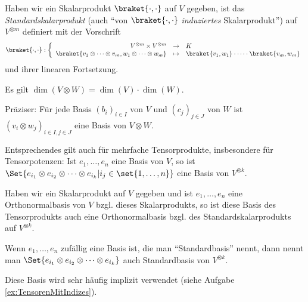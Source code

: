 \begin{lemmadef}
Haben wir ein Skalarprodukt $\braket{\cdot,\cdot}$ auf $V$ gegeben, ist das \emph{Standardskalarprodukt} (auch \enquote{von $\braket{\cdot,\cdot}$ \emph{induziertes} Skalarprodukt}) auf $V^{\otimes m}$ definiert mit der Vorschrift
\[
\braket{\cdot, \cdot} : 
\left\lbrace \begin{array}{rcl}
	V^{\otimes m} \times V^{\otimes m} &\to& K \\
\braket{v_1 \otimes \cdots \otimes v_m, w_1 \otimes \cdots \otimes w_m} &\mapsto& \braket{v_1,w_1} \cdot \cdots \cdot \braket{v_m, w_m}
\end{array}\right.
\]
und ihrer linearen Fortsetzung.
\end{lemmadef}

\begin{lemma}\label{tensorprodukt:dimension}
Es gilt $\dim(V\otimes W) = \dim(V)\cdot\dim(W)$.

Präziser: Für jede Basis $(b_i)_{i\in I}$ von $V$ und $(c_j)_{j\in J}$ von $W$ ist $(v_i\otimes w_j)_{i\in I, j\in J}$ eine Basis von $V\otimes W$.
\end{lemma}

\begin{corollary}
Entsprechendes gilt auch für mehrfache Tensorprodukte, insbesondere für Tensorpotenzen: Ist $e_1,\ldots,e_n$ eine Basis von $V$, so ist $\Set{e_{i_1} \otimes e_{i_2} \otimes \cdots \otimes e_{i_k} | i_j\in\set{1,\ldots,n}}$ eine Basis von $V^{\otimes k}$.

Haben wir ein Skalarprodukt auf $V$ gegeben und ist $e_1, \ldots, e_n$ eine Orthonormalbasis von $V$ bzgl. dieses Skalarprodukts, so ist diese Basis des Tensorprodukts auch eine Orthonormalbasis bzgl. des Standardskalarprodukts auf $V^{\otimes k}$.
\end{corollary}

\begin{definition}
Wenn $e_1, \ldots, e_n$ zufällig eine Basis ist, die man \enquote{Standardbasis} nennt, dann nennt man $\Set{e_{i_1} \otimes e_{i_2} \otimes \cdots \otimes e_{i_k}}$ auch Standardbasis von $V^{\otimes k}$. 

Diese Basis wird sehr häufig implizit verwendet (siehe Aufgabe \ref{ex:TensorenMitIndizes}).
\end{definition}

